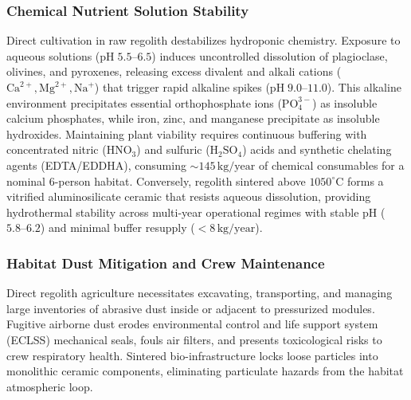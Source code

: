 \subsubsection{Chemical Nutrient Solution Stability}
Direct cultivation in raw regolith destabilizes hydroponic chemistry\cite{ming1989lunar,hendrix2019measurement}. Exposure to aqueous solutions ($\mathrm{pH}\;5.5\text{--}6.5$) induces uncontrolled dissolution of plagioclase, olivines, and pyroxenes, releasing excess divalent and alkali cations ($\mathrm{Ca}^{2+}, \mathrm{Mg}^{2+}, \mathrm{Na}^+$) that trigger rapid alkaline spikes ($\mathrm{pH}\;9.0\text{--}11.0$)\cite{ming1989lunar,hendrix2024reactivity,hendrix2019measurement}. This alkaline environment precipitates essential orthophosphate ions ($\mathrm{PO}_4^{3-}$) as insoluble calcium phosphates, while iron, zinc, and manganese precipitate as insoluble hydroxides\cite{ming1989lunar,atkin2024bioremediation,wamelink2024struvite}. Maintaining plant viability requires continuous buffering with concentrated nitric ($\mathrm{HNO}_3$) and sulfuric ($\mathrm{H}_2\mathrm{SO}_4$) acids and synthetic chelating agents (EDTA/EDDHA), consuming $\sim 145\,\mathrm{kg/year}$ of chemical consumables for a nominal 6-person habitat\cite{ming1989lunar,atkin2024bioremediation,krejci2026lunar}. Conversely, regolith sintered above $1050^\circ\mathrm{C}$ forms a vitrified aluminosilicate ceramic that resists aqueous dissolution, providing hydrothermal stability across multi-year operational regimes with stable $\mathrm{pH}$ ($5.8\text{--}6.2$) and minimal buffer resupply ($<8\,\mathrm{kg/year}$)\cite{ming1989lunar}.

\subsubsection{Habitat Dust Mitigation and Crew Maintenance}
Direct regolith agriculture necessitates excavating, transporting, and managing large inventories of abrasive dust inside or adjacent to pressurized modules\cite{paul2022plants,ming1989lunar}. Fugitive airborne dust erodes environmental control and life support system (ECLSS) mechanical seals, fouls air filters, and presents toxicological risks to crew respiratory health\cite{paul2022plants,ming1989lunar,hendrix2024reactivity,wallace2022assessment}. Sintered bio-infrastructure locks loose particles into monolithic ceramic components, eliminating particulate hazards from the habitat atmospheric loop\cite{ming1989lunar}.

